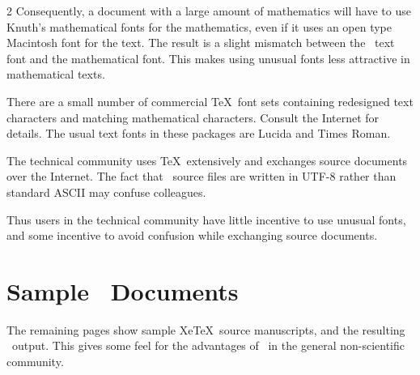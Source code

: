 \documentclass[11pt, oneside]{amsart}
\begin{document}
\begin{multicols}{2}
Consequently, a document with a large amount of mathematics will have to use Knuth's mathematical fonts for the mathematics, even if it uses an open type Macintosh font for the text.  The result is  a slight mismatch between the \ text font and the  mathematical font. This makes using unusual fonts less attractive in mathematical texts.

There are a small number of commercial \TeX\ font sets containing redesigned text characters and matching mathematical characters. Consult the Internet for details. The usual text fonts in these packages are Lucida and Times Roman.

The technical community uses \TeX\ extensively and exchanges source documents over the Internet. The fact that \XeLaTeX\ source files are written in UTF-8 rather than standard ASCII may confuse colleagues. 

Thus users in the technical community have little incentive to use unusual fonts, and some incentive to avoid confusion while exchanging source documents.

\section{Sample \XeLaTeX\ Documents}

The remaining pages show sample Xe\TeX\ source manuscripts, and the resulting \XeLaTeX\ output. This gives some feel for the advantages of \XeLaTeX\ in the general non-scientific community. 
\end{multicols}
\end{document}
